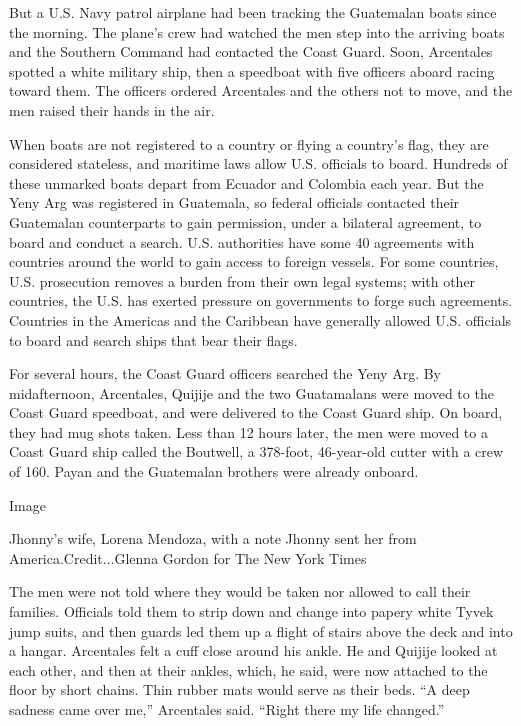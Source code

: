 But a U.S. Navy patrol airplane had been tracking the Guatemalan boats
since the morning. The plane's crew had watched the men step into the
arriving boats and the Southern Command had contacted the Coast Guard.
Soon, Arcentales spotted a white military ship, then a speedboat with
five officers aboard racing toward them. The officers ordered Arcentales
and the others not to move, and the men raised their hands in the air.

When boats are not registered to a country or flying a country's flag,
they are considered stateless, and maritime laws allow U.S. officials to
board. Hundreds of these unmarked boats depart from Ecuador and Colombia
each year. But the Yeny Arg was registered in Guatemala, so federal
officials contacted their Guatemalan counterparts to gain permission,
under a bilateral agreement, to board and conduct a search. U.S.
authorities have some 40 agreements with countries around the world to
gain access to foreign vessels. For some countries, U.S. prosecution
removes a burden from their own legal systems; with other countries, the
U.S. has exerted pressure on governments to forge such agreements.
Countries in the Americas and the Caribbean have generally allowed U.S.
officials to board and search ships that bear their flags.

For several hours, the Coast Guard officers searched the Yeny Arg. By
midafternoon, Arcentales, Quijije and the two Guatamalans were moved to
the Coast Guard speedboat, and were delivered to the Coast Guard ship.
On board, they had mug shots taken. Less than 12 hours later, the men
were moved to a Coast Guard ship called the Boutwell, a 378-foot,
46-year-old cutter with a crew of 160. Payan and the Guatemalan brothers
were already onboard.

Image

Jhonny's wife, Lorena Mendoza, with a note Jhonny sent her from
America.Credit...Glenna Gordon for The New York Times

The men were not told where they would be taken nor allowed to call
their families. Officials told them to strip down and change into papery
white Tyvek jump suits, and then guards led them up a flight of stairs
above the deck and into a hangar. Arcentales felt a cuff close around
his ankle. He and Quijije looked at each other, and then at their
ankles, which, he said, were now attached to the floor by short chains.
Thin rubber mats would serve as their beds. ``A deep sadness came over
me,'' Arcentales said. ``Right there my life changed.''

